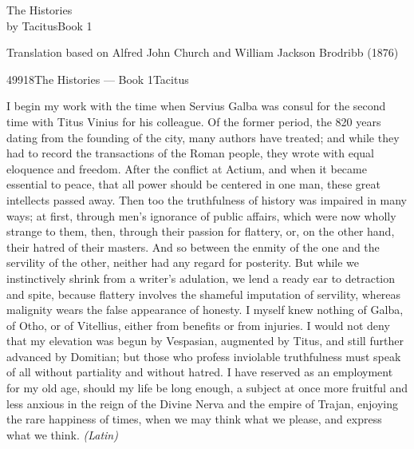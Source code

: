
The Histories\\
by TacitusBook 1

Translation based on Alfred John Church and William Jackson Brodribb (1876)

49918The Histories — Book 1Tacitus


I begin my work with the time when Servius Galba was consul for the second time with Titus Vinius for his colleague. Of the former period, the 820 years dating from the founding of the city, many authors have treated; and while they had to record the transactions of the Roman people, they wrote with equal eloquence and freedom. After the conflict at Actium, and when it became essential to peace, that all power should be centered in one man, these great intellects passed away. Then too the truthfulness of history was impaired in many ways; at first, through men's ignorance of public affairs, which were now wholly strange to them, then, through their passion for flattery, or, on the other hand, their hatred of their masters. And so between the enmity of the one and the servility of the other, neither had any regard for posterity. But while we instinctively shrink from a writer's adulation, we lend a ready ear to detraction and spite, because flattery involves the shameful imputation of servility, whereas malignity wears the false appearance of honesty. I myself knew nothing of Galba, of Otho, or of Vitellius, either from benefits or from injuries. I would not deny that my elevation was begun by Vespasian, augmented by Titus, and still further advanced by Domitian; but those who profess inviolable truthfulness must speak of all without partiality and without hatred. I have reserved as an employment for my old age, should my life be long enough, a subject at once more fruitful and less anxious in the reign of the Divine Nerva and the empire of Trajan, enjoying the rare happiness of times, when we may think what we please, and express what we think. \emph{(Latin)}


